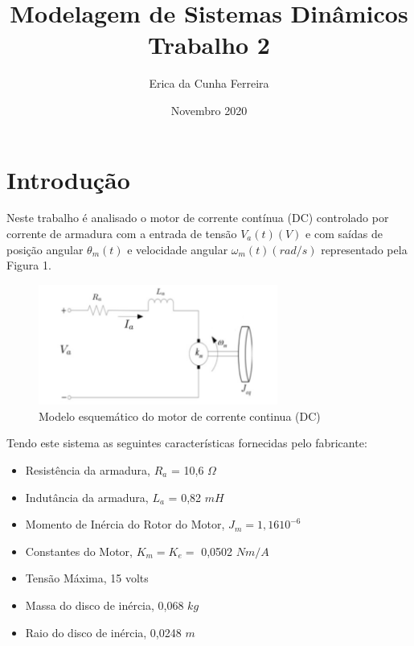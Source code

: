 \documentclass[12pt]{article}
\title{%
    Modelagem de Sistemas Dinâmicos\\ %
    \large Trabalho 2}
\author{Erica da Cunha Ferreira }
\date{Novembro 2020}
\begin{document}
\maketitle
{} 

\newpage
\tableofcontents
\newpage
{} 

\cleardoublepage{}
\section{Introdução}

\quad  Neste trabalho é analisado o motor de corrente contínua (DC) controlado por corrente de armadura com a entrada de tensão $V_a (t)(V)$ e com saídas de posição angular $\theta_m (t)$ e velocidade angular $\omega_m (t)(rad/s)$ representado pela Figura 1.

\begin{figure}[H]
    \centering
    \includegraphics[width = 0.7\textwidth]{Sistema.jpg}
    \caption{Modelo esquemático do motor de corrente continua (DC)}
    \label{fig:mesh1}
\end{figure}

Tendo este sistema as seguintes características fornecidas pelo fabricante:

\begin{itemize}
    \item Resistência da armadura, $R_a$ = 10,6 $\Omega$
    \item Indutância da armadura, $L_a$ = 0,82 $mH$
    \item Momento de Inércia do Rotor do Motor, $J_m = 1,16 10^{-6}$ 
    \item Constantes do Motor, $K_m = K_e =$ 0,0502 $Nm/A$
    \item Tensão Máxima, 15 volts
    \item Massa do disco de inércia, 0,068 $kg$
    \item Raio do disco de inércia, 0,0248 $m$
\end{itemize}
\end{document}

